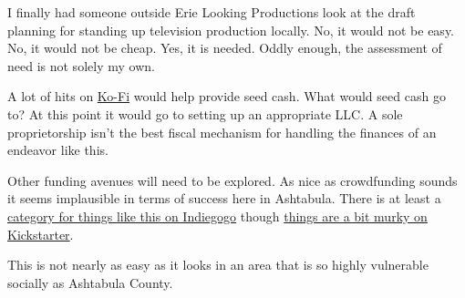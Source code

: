 I finally had someone outside Erie Looking Productions look at the draft
planning for standing up television production locally. No, it would not
be easy. No, it would not be cheap. Yes, it is needed. Oddly enough, the
assessment of need is not solely my own.

A lot of hits on \href{https://ko-fi.com/smkellat}{Ko-Fi} would help
provide seed cash. What would seed cash go to? At this point it would go
to setting up an appropriate LLC. A sole proprietorship isn't the best
fiscal mechanism for handling the finances of an endeavor like this.

Other funding avenues will need to be explored. As nice as crowdfunding
sounds it seems implausible in terms of success here in Ashtabula. There
is at least a
\href{https://www.indiegogo.com/explore/web-series-tv-shows?project_type=campaign&project_timing=all&sort=trending}{category
for things like this on Indiegogo} though
\href{https://www.kickstarter.com/publishing?ref=section-film-nav-click-publishing}{things
are a bit murky on Kickstarter}.

This is not nearly as easy as it looks in an area that is so highly
vulnerable socially as Ashtabula County.
